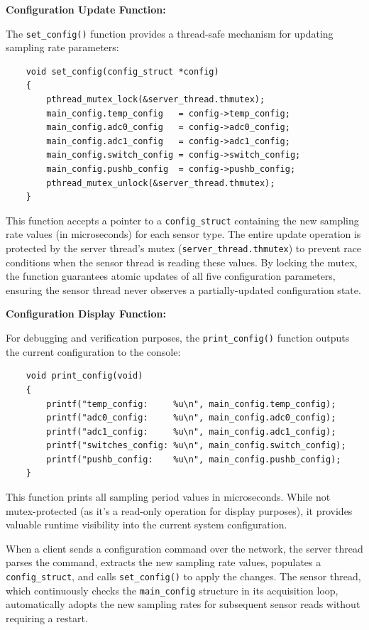 \textbf{Configuration Update Function:}

The \texttt{set\_config()} function provides a thread-safe mechanism for updating sampling rate parameters:

\begin{verbatim}
	void set_config(config_struct *config)
	{
		pthread_mutex_lock(&server_thread.thmutex);
		main_config.temp_config   = config->temp_config;
		main_config.adc0_config   = config->adc0_config;
		main_config.adc1_config   = config->adc1_config;
		main_config.switch_config = config->switch_config;
		main_config.pushb_config  = config->pushb_config;
		pthread_mutex_unlock(&server_thread.thmutex);
	}
\end{verbatim}

This function accepts a pointer to a \texttt{config\_struct} containing the new sampling rate values (in microseconds) for each sensor type. The entire update operation is protected by the server thread's mutex (\texttt{server\_thread.thmutex}) to prevent race conditions when the sensor thread is reading these values. By locking the mutex, the function guarantees atomic updates of all five configuration parameters, ensuring the sensor thread never observes a partially-updated configuration state.

\textbf{Configuration Display Function:}

For debugging and verification purposes, the \texttt{print\_config()} function outputs the current configuration to the console:

\begin{verbatim}
	void print_config(void)
	{
		printf("temp_config:     %u\n", main_config.temp_config);
		printf("adc0_config:     %u\n", main_config.adc0_config);
		printf("adc1_config:     %u\n", main_config.adc1_config);
		printf("switches_config: %u\n", main_config.switch_config);
		printf("pushb_config:    %u\n", main_config.pushb_config);
	}
\end{verbatim}

This function prints all sampling period values in microseconds. While not mutex-protected (as it's a read-only operation for display purposes), it provides valuable runtime visibility into the current system configuration.

When a client sends a configuration command over the network, the server thread parses the command, extracts the new sampling rate values, populates a \texttt{config\_struct}, and calls \texttt{set\_config()} to apply the changes. The sensor thread, which continuously checks the \texttt{main\_config} structure in its acquisition loop, automatically adopts the new sampling rates for subsequent sensor reads without requiring a restart.


